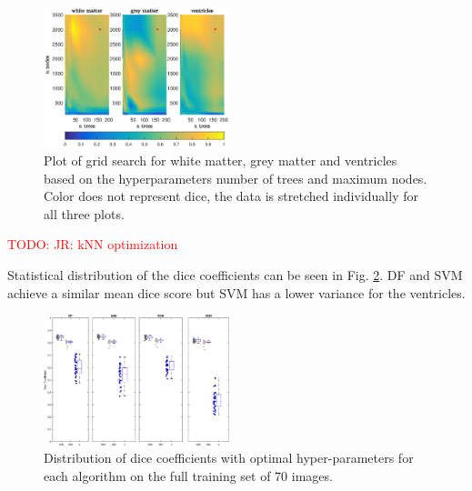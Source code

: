 \documentclass[journal]{IEEEtran}
\newcommand\TODO[1]{\textcolor{red}{TODO: #1}}
\begin{document}
\begin{figure}[h!]\label{f.df_white}
	\centering
	\includegraphics[width=0.48\textwidth]{images/df_grid}
	\caption{Plot of grid search for white matter, grey matter and ventricles based on the hyperparameters number of trees and maximum nodes. Color does not represent dice, the data is stretched individually for all three plots.}
\end{figure}

\TODO{JR: kNN optimization}

Statistical distribution of the dice coefficients can be seen in Fig. \ref{f.boxplot}. DF and SVM achieve a similar mean dice score but SVM has a lower variance for the ventricles.
\begin{figure}\label{f.boxplot}
	\centering
	\includegraphics[width=0.48\textwidth]{images/boxplot}
	\caption{Distribution of dice coefficients with optimal hyper-parameters for each algorithm on the full training set of 70 images.}
\end{figure}
\end{document}
